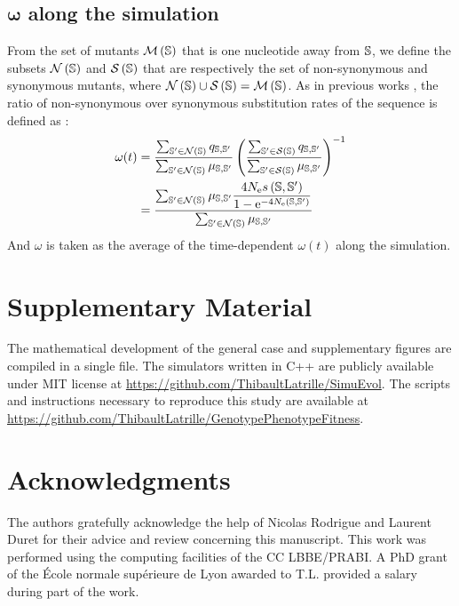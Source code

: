 \documentclass{MBE}%
\begin{document}
\subsection*{$\bm{\omega}$ along the simulation}
From the set of mutants $\mathcal{M}\left(\mathbb{S}\right)$ that is one nucleotide away from $\mathbb{S}$, we define the subsets $\mathcal{N}\left(\mathbb{S}\right)$ and $\mathcal{S}\left(\mathbb{S}\right)$ that are respectively the set of non-synonymous and synonymous mutants, where $\mathcal{N}\left(\mathbb{S}\right) \cup \mathcal{S}\left(\mathbb{S}\right) = \mathcal{M}\left(\mathbb{S}\right)$.
As in previous works \citep{Spielman2015a, DosReis2015, Jones2016}, the ratio of non-synonymous over synonymous substitution rates of the sequence is defined as :
\begin{align}
\omega(t) &= \dfrac{\sum_{\mathbb{S}' \in \mathcal{N}\left(\mathbb{S}\right)} q_{\mathbb{S}, \mathbb{S}'}}{\sum_{\mathbb{S}' \in \mathcal{N}\left(\mathbb{S}\right)} \mu_{\mathbb{S}, \mathbb{S}'}} \left( \dfrac{\sum_{\mathbb{S}' \in \mathcal{S}\left(\mathbb{S}\right)} q_{\mathbb{S}, \mathbb{S}'}}{\sum_{\mathbb{S}' \in \mathcal{S}\left(\mathbb{S}\right)} \mu_{\mathbb{S}, \mathbb{S}'}} \right)^{-1}\\
&= \dfrac{\sum_{\mathbb{S}' \in \mathcal{N}\left(\mathbb{S}\right)} \mu_{\mathbb{S}, \mathbb{S}'} \dfrac{4 N_{\mathrm{e}} s \left( \mathbb{S},\mathbb{S}'\right)}{{1 - \mathrm{e}^{-4 N_{\mathrm{e}} \left( \mathbb{S},\mathbb{S}'\right)} }}}{\sum_{\mathbb{S}' \in \mathcal{N}\left(\mathbb{S}\right)} \mu_{\mathbb{S}, \mathbb{S}'}} 
\end{align}
And $\omega$ is taken as the average of the time-dependent $\omega(t)$ along the simulation.


\section{Supplementary Material}
The mathematical development of the general case and supplementary figures are compiled in a single file.
The simulators written in C++ are publicly available under MIT license at \url{https://github.com/ThibaultLatrille/SimuEvol}.
The scripts and instructions necessary to reproduce this study are available at \url{https://github.com/ThibaultLatrille/GenotypePhenotypeFitness}.

\section{Acknowledgments}

The authors gratefully acknowledge the help of Nicolas Rodrigue and Laurent Duret for their advice and review concerning this manuscript.
This work was performed using the computing facilities of the CC LBBE/PRABI.
A PhD grant of the École normale supérieure de Lyon awarded to T.L. provided a salary during part of the work.



\end{document}
